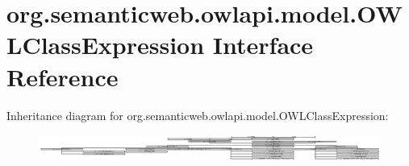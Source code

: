 \hypertarget{interfaceorg_1_1semanticweb_1_1owlapi_1_1model_1_1_o_w_l_class_expression}{\section{org.\-semanticweb.\-owlapi.\-model.\-O\-W\-L\-Class\-Expression Interface Reference}
\label{interfaceorg_1_1semanticweb_1_1owlapi_1_1model_1_1_o_w_l_class_expression}
}
Inheritance diagram for org.\-semanticweb.\-owlapi.\-model.\-O\-W\-L\-Class\-Expression\-:\begin{figure}[H]
\begin{center}
\leavevmode
\includegraphics[height=0.890585cm]{interfaceorg_1_1semanticweb_1_1owlapi_1_1model_1_1_o_w_l_class_expression}
\end{center}
\end{figure}
